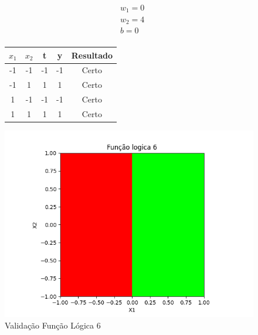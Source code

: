 \begin{figure}[h!]
\centering
\begin{minipage}[c]{0.49\linewidth}
\centering
\[
\begin{aligned}
&w_1 = 0\\
&w_2 = 4\\
&b = 0\\
\end{aligned}
\]
\begin{tabular}{|c|c|c|c|c|}\hline
$x_1$ & $x_2$ & t & y & Resultado\\ \hline
 -1 & -1 & -1 & -1 & Certo\\ \hline
 -1 & 1 & 1 & 1 & Certo\\ \hline
 1 & -1 & -1 & -1 & Certo\\ \hline
 1 & 1 & 1 & 1 & Certo\\ \hline
\end{tabular}
\end{minipage}
\hfill
\begin{minipage}[c]{0.5\linewidth}
\centering
\singlespacing
\includegraphics[width=1.2\textwidth]{im/im6}
\end{minipage}
\caption{Validação Função Lógica 6}
\label{vl6}
\end{figure}

